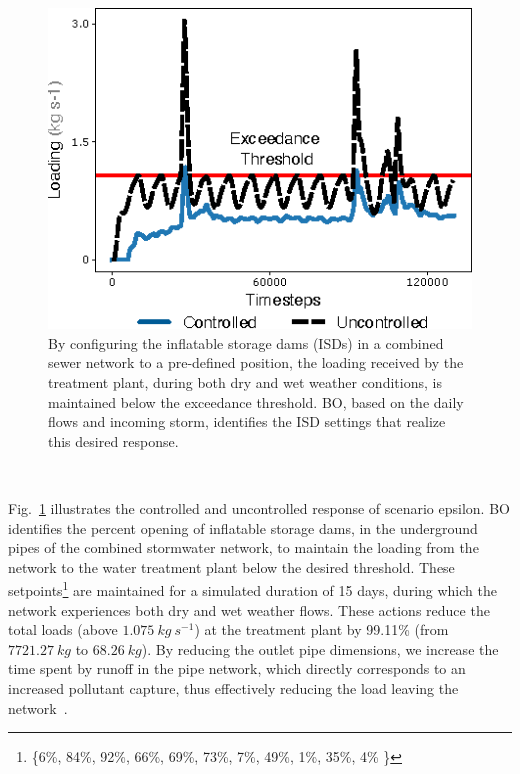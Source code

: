 \begin{figure}[ht]
	\includegraphics[width=\textwidth]{gfx/Chapter-4/epsilon.eps}
	\caption{By configuring the inflatable storage dams (ISDs) in a combined sewer network to a pre-defined position, the loading received by the treatment plant, during both dry and wet weather conditions, is maintained below the exceedance threshold. 
	BO, based on the daily flows and incoming storm, identifies the ISD settings that realize this desired response.}\label{fig:epsilon}
\end{figure}

\

Fig.~\ref{fig:epsilon} illustrates the controlled and uncontrolled response of scenario epsilon.
BO identifies the percent opening of inflatable storage dams, in the underground pipes of the combined stormwater network, to maintain the loading from the network to the water treatment plant below the desired threshold.
These setpoints\footnote{\{6\%, 84\%, 92\%, 66\%, 69\%, 73\%, 7\%, 49\%, 1\%, 35\%, 4\% \}} are maintained for a simulated duration of 15 days, during which the network experiences both dry and wet weather flows.
These actions reduce the total loads (above $1.075\ kg\ s^{-1}$) at the treatment plant by 99.11\% (from $7721.27\ kg$ to $68.26\ kg$).
By reducing the outlet pipe dimensions, we increase the time spent by runoff in the pipe network, which directly corresponds to an increased pollutant capture, thus effectively reducing the load leaving the network~\cite{Troutman_2020}.





